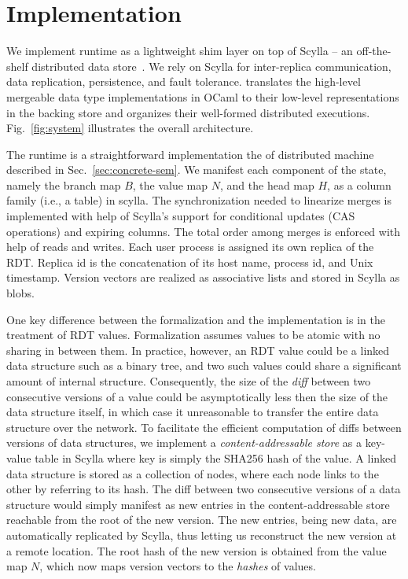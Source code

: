 \section{Implementation}
\label{sec:implementation}

We implement \quark runtime as a lightweight shim layer on top of
Scylla -- an off-the-shelf distributed data store~\cite{scylla}. We
rely on Scylla for inter-replica communication, data replication,
persistence, and fault tolerance. \quark translates the high-level
mergeable data type implementations in OCaml to their low-level
representations in the backing store and organizes their well-formed
distributed executions. Fig.~\ref{fig:system} illustrates the overall
architecture.

The runtime \quark is a straightforward implementation the of
distributed machine \quark described in Sec.~\ref{sec:concrete-sem}.
We manifest each component of the state, namely the branch map $B$,
the value map $N$, and the head map $H$, as a column family (i.e., a
table) in scylla. The synchronization needed to linearize merges is
implemented with help of Scylla's support for conditional updates (CAS
operations) and expiring columns. The total order among merges is
enforced with help of  reads and writes. Each user process
is assigned its own replica of the RDT.  Replica id is the
concatenation of its host name, process id, and Unix timestamp.
Version vectors are realized as associative lists and stored in Scylla
as blobs.

One key difference between the formalization and the implementation is
in the treatment of RDT values. Formalization assumes values to be
atomic with no sharing in between them. In practice, however, an RDT
value could be a linked data structure such as a binary tree, and two
such values could share a significant amount of internal structure.
Consequently, the size of the \emph{diff} between two consecutive
versions of a value could be asymptotically less then the size of the
data structure itself, in which case it unreasonable to transfer the
entire data structure over the network. To facilitate the efficient
computation of diffs between versions of data structures, we implement
a \emph{content-addressable store} as a key-value table in Scylla
where key is simply the SHA256 hash of the value. A linked data
structure is stored as a collection of nodes, where each node links to
the other by referring to its hash. The diff between two consecutive
versions of a data structure would simply manifest as new entries in
the content-addressable store reachable from the root of the new
version. The new entries, being new data, are automatically replicated
by Scylla, thus letting us reconstruct the new version at a remote
location. The root hash of the new version is obtained from the value
map $N$, which now maps version vectors to the \emph{hashes} of
values.
